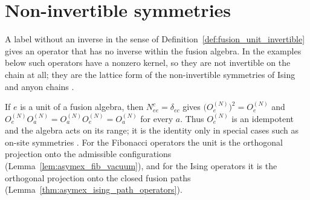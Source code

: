\section{Non-invertible symmetries}%
\label{sec:mposym_noninvertible}

A label without an inverse in the sense of
Definition~\ref{def:fusion_unit_invertible} gives an operator that has no
inverse within the fusion algebra. In the examples below such operators have
a nonzero kernel, so they are not invertible on the chain at all; they are
the lattice form of the non-invertible symmetries of Ising and anyon chains
\cite{Aasen2016Topological,Bultinck2017Anyons,Cirac2021Matrix}.

\begin{remark}%
    \label{rem:mposym_unit_projector}
    If $e$ is a unit of a fusion algebra, then $N_{ee}^c=\delta_{ec}$ gives
    $\bigl(O_e^{(N)}\bigr)^2=O_e^{(N)}$ and $O_e^{(N)}O_a^{(N)}=O_a^{(N)}
        O_e^{(N)}=O_a^{(N)}$ for every $a$. Thus $O_e^{(N)}$ is an idempotent
    and the algebra acts on its range; it is the identity only in special
    cases such as on-site symmetries
    \cite[Section~4]{GarreRubio2023MPOSym}. For the Fibonacci operators the
    unit is the orthogonal projection onto the admissible configurations
    (Lemma~\ref{lem:asymex_fib_vacuum}), and for the Ising operators it is
    the orthogonal projection onto the closed fusion paths
    (Lemma~\ref{thm:asymex_ising_path_operators}).
\end{remark}

